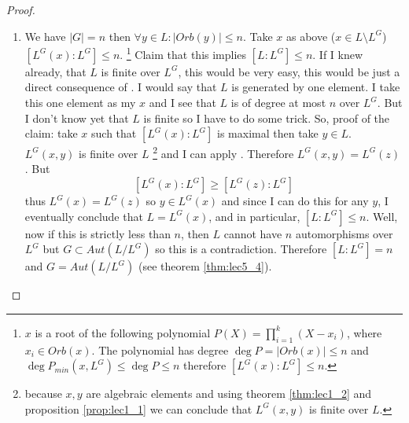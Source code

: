 \begin{theorem}[Artin]
\begin{proof}
\begin{enumerate}
      is $G$-invariant
      \footnote{
        I.e. $\forall g \in G: g\left(P\left(X\right)\right) =
        P\left(X\right)$
      }
      . $G$ just permutes  the $x_i$, it permutes the factors of these
      polynomial, 
      so the polynomial is $G$-invariant. Therefore its coefficients are
      $G$-invariant and as result $P \in L^G\left[X\right]$ by
      definition \ref{def:setinvariants}. $L^G$ is a field of $G$
      invariants, and it is 
      separable. $P$ is separable, 
      because all $x_i$ are distinct ( there are distinct elements of the
      orbit ). And $L$ is splitting field of $P$, therefore $L$ is a
       over $L^G$ by the
       definition.
    \item We have $\left|G\right| = n$ then
      $\forall y \in L: \left|Orb\left(y\right)\right| \le n$. Take
      $x$ as above ($x \in L \setminus L^G$)
      $\left[L^G\left(x\right): L^G\right] \le n$.
      \footnote{
        $x$ is a root of the following polynomial $P\left(X\right) =
        \prod_{i=1}^k\left(X - x_i\right)$, where $x_i \in
        Orb(x)$. The polynomial has degree $\deg P =
        \left|Orb(x)\right| \le n$ and
        $\deg P_{min}\left(x, L^G\right) \le \deg P \le n$ therefore
        $\left[L^G\left(x\right): L^G\right] \le n$.
      }
      Claim that this
      implies $\left[L:L^G\right] \le n$. If I knew already, that $L$ is
      finite over $L^G$, this would be very easy, this would be just a
      direct consequence of . I
      would say that $L$ is generated by one element. I take this one element as
      my $x$ and I see that $L$ is of degree at most $n$ over $L^G$. But I
      don't know yet that $L$ is finite so I have to do some trick. So,
      proof of the claim:  take $x$ such that
      $\left[L^G\left(x\right):L^G\right]$ is maximal then take $y \in
      L$. $L^G\left(x,y\right)$ is finite over $L$
      \footnote{
        because $x,y$ are algebraic elements and using theorem
        \ref{thm:lec1_2} and proposition \ref{prop:lec1_1} we can
        conclude that $L^G\left(x,y\right)$ is finite over $L$.
      }
      and I can apply
      . Therefore
      $L^G\left(x,y\right) = L^G\left(z\right)$. But
      \[
      \left[L^G\left(x\right):L^G\right] \ge
      \left[L^G\left(z\right):L^G\right]
      \]
      thus $L^G\left(x\right) = L^G\left(z\right)$ so
      $y \in L^G\left(x\right)$ and since I can do this for any $y$, I
      eventually conclude that $L = L^G\left(x\right)$, and in
      particular, $\left[L: L^G\right] \le n$. Well, now if this is
      strictly less than $n$, then $L$ cannot have $n$ automorphisms
      over $L^G$ but $G \subset Aut\left(L/L^G\right)$ so this is a
      contradiction. Therefore $\left[L: L^G\right] = n$ and
      $G = Aut\left(L/L^G\right)$ (see theorem \ref{thm:lec5_4}).
    \end{enumerate}
  \end{proof}
\end{theorem}
